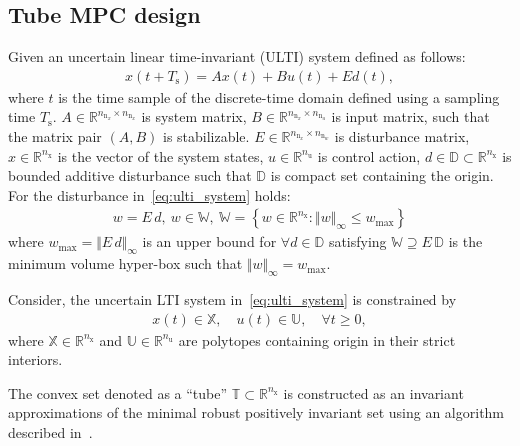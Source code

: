 \documentclass[letterpaper, 10 pt, conference]{ieeeconf}
\begin{document}
\subsection{Tube MPC design}
\label{sec:tube_mpc}

Given an uncertain linear time-invariant (ULTI) system defined as follows:
\begin{eqnarray}
	\label{eq:ulti_system}
	x(t+T_{\mathrm{s}}) = A x(t) + B u(t) + E d(t), %
\end{eqnarray}
where $t$ is the time sample of the discrete-time domain defined using a sampling time $T_{\mathrm{s}}$. $A \in \mathbb{R}^{n_{\mathrm{n}_{x}} \times n_{\mathrm{n}_{x}}}$ is system matrix, $B \in \mathbb{R}^{n_{\mathrm{n}_{x}} \times n_{\mathrm{n}_{u}}}$ is input matrix, such that the matrix pair $(A,B)$ is stabilizable. $E \in \mathbb{R}^{n_{\mathrm{n}_{x}} \times n_{\mathrm{n}_{w}}}$ is disturbance matrix, $x \in \mathbb{R}^{n_{\mathrm{x}}}$ is the vector of the system states, $u \in \mathbb{R}^{n_{\mathrm{u}}}$ is control action, $d \in \mathbb{D} \subset \mathbb{R}^{n_{\mathrm{x}}}$ is bounded additive disturbance such that $\mathbb{D}$ is compact set containing the origin. 
For the disturbance in~\eqref{eq:ulti_system} holds:
\begin{eqnarray}
	\label{eq:disturbance_set}
	w = E \, d, ~ w \in \mathbb{W}, ~ \mathbb{W} = \left\{ w \in \mathbb{R}^{n_{\mathrm{x}}} : \Vert w \Vert_{\infty} \leq w_{\max} \right\}
\end{eqnarray}
where $w_{\max} = \Vert E \, d \Vert_{\infty}$ is an upper bound for $\forall d \in \mathbb{D}$ satisfying $\mathbb{W} \supseteq E \, \mathbb{D}$ is the minimum volume hyper-box such that $\Vert w \Vert_{\infty} = w_{\max}$.

Consider, the uncertain LTI system in~\eqref{eq:ulti_system} is constrained by
\begin{eqnarray}
	\label{eq:constraints_x_u}
	x(t) \in \mathbb{X}, \quad u(t) \in \mathbb{U}, \quad \forall t \geq 0,
\end{eqnarray}
where $\mathbb{X} \in \mathbb{R}^{n_{\mathrm{x}}}$ and $\mathbb{U} \in \mathbb{R}^{n_{\mathrm{u}}}$ are polytopes containing origin in their strict interiors. 

The convex set denoted as a ``tube'' $\mathbb{T} \subset \mathbb{R}^{n_{\mathrm{x}}}$ is  constructed as an invariant approximations of the minimal robust positively invariant set using an algorithm described in~\cite{RK05}.

\end{document}
